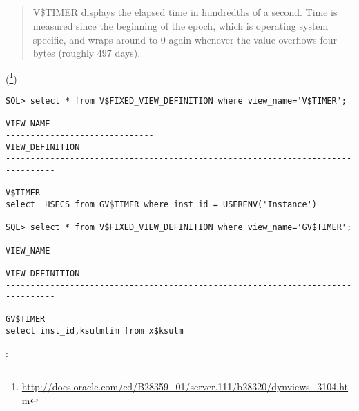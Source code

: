 \subsection{ \oracle}

 

\begin{framed}
\begin{quotation}
V\$TIMER displays the elapsed time in hundredths of a second. Time is measured since the beginning of the epoch, which is operating system specific, and wraps around to 0 again whenever the value overflows four bytes (roughly 497 days).
\end{quotation}
\end{framed}(\footnote{\url{http://docs.oracle.com/cd/B28359_01/server.111/b28320/dynviews_3104.htm}})



\begin{lstlisting}
SQL> select * from V$FIXED_VIEW_DEFINITION where view_name='V$TIMER';

VIEW_NAME
------------------------------
VIEW_DEFINITION
--------------------------------------------------------------------------------

V$TIMER
select  HSECS from GV$TIMER where inst_id = USERENV('Instance')

SQL> select * from V$FIXED_VIEW_DEFINITION where view_name='GV$TIMER';

VIEW_NAME
------------------------------
VIEW_DEFINITION
--------------------------------------------------------------------------------

GV$TIMER
select inst_id,ksutmtim from x$ksutm
\end{lstlisting}

:

